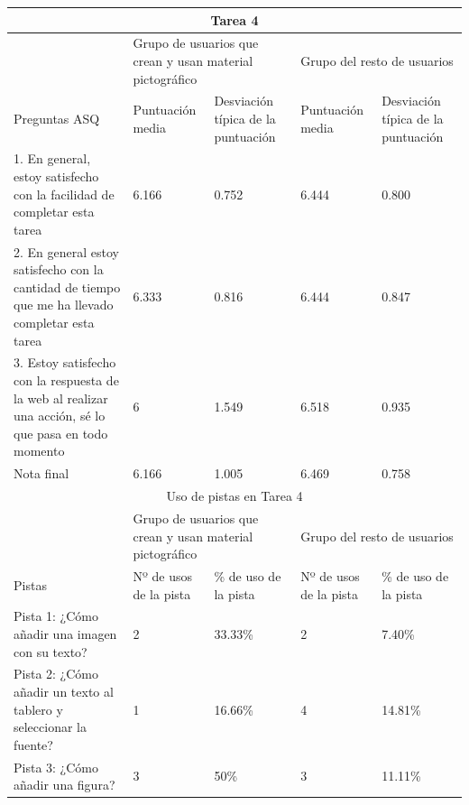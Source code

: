 \begin{tabular}{ |p{4cm}|p{2cm}|p{2cm}|p{2cm}|p{2cm}|  }
	\hline
	\multicolumn{5}{|c|}{Tarea 4} \\
	\hline
	& \multicolumn{2}{|p{4cm}|}{Grupo de usuarios que crean y usan material pictográfico} & \multicolumn{2}{|p{4cm}|}{Grupo del resto de usuarios }  \\ 
	\hline
	Preguntas ASQ & Puntuación media  &Desviación típica de la puntuación & Puntuación media & Desviación típica de la puntuación\\
	\hline
	1. En general, estoy satisfecho con la facilidad de completar esta tarea &6.166  &0.752 &6.444  &0.800\\
	\hline
	2. En general estoy satisfecho con la cantidad de tiempo que me ha llevado completar esta tarea &6.333  &0.816  &6.444 &0.847\\
	\hline
	3. Estoy satisfecho con la respuesta de la web al realizar una acción, sé lo que pasa en todo momento &6 &1.549 &6.518   &0.935\\
	\hline
	Nota final &6.166 &1.005 &6.469  &0.758\\
	\hline
	\multicolumn{5}{|c|}{Uso de pistas en Tarea 4} \\
	\hline
	& \multicolumn{2}{|p{4cm}|}{Grupo de usuarios que crean y usan material pictográfico} & \multicolumn{2}{|p{4cm}|}{Grupo del resto de usuarios }  \\ 
	\hline
	Pistas &Nº de usos de la pista &\% de uso de la pista&Nº de usos de la pista&\% de uso de la pista\\
	\hline
	Pista 1: ¿Cómo añadir una imagen con su texto? &2  &33.33\% &2 &7.40\%\\
	\hline
	Pista 2: ¿Cómo añadir un texto al tablero y seleccionar la fuente? &1 &16.66\%  &4 &14.81\%\\
	\hline
	Pista 3: ¿Cómo añadir una figura? &3 &50\% &3   &11.11\% \\
	\hline
\end{tabular}